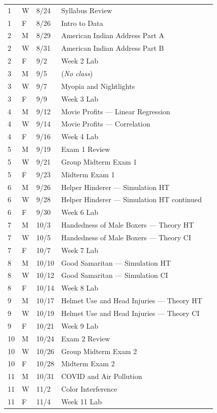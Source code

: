 \documentclass[
]{report}
\begin{document}
\begin{longtable}{|l|l|l|l|p{}|}
1& W& 8/24& Syllabus Review \\*
1& F& 8/26& Intro to Data \\ \hline
2& M& 8/29& American Indian Address Part A \\*
2& W& 8/31& American Indian Address Part B \\* 
2& F& 9/2& Week 2 Lab \\ \hline
3& M& 9/5& (\textit{No class}) \\*
3& W& 9/7& Myopia and Nightlights \\*
3& F& 9/9& Week 3 Lab \\ \hline
4& M& 9/12& Movie Profits --- Linear Regression \\*
4& W& 9/14& Movie Profits --- Correlation \\*
4& F& 9/16& Week 4 Lab \\ \hline
5& M& 9/19& Exam 1 Review \\*
5& W& 9/21& Group Midterm Exam 1 \\*    
5& F& 9/23& Midterm Exam 1 \\ \hline
6& M& 9/26& Helper Hinderer --- Simulation HT \\*
6& W& 9/28& Helper Hinderer --- Simulation HT continued \\* 
6& F& 9/30& Week 6 Lab \\ \hline
7& M& 10/3& Handedness of Male Boxers --- Theory HT \\*
7& W& 10/5&  Handedness of Male Boxers --- Theory CI\\*
7& F& 10/7& Week 7 Lab \\ \hline
8& M& 10/10& Good Samaritan --- Simulation HT \\*
8& W& 10/12& Good Samaritan --- Simulation CI \\*   
8& F& 10/14& Week 8 Lab \\ \hline
9& M& 10/17& Helmet Use and Head Injuries --- Theory HT \\*
9& W& 10/19& Helmet Use and Head Injuries --- Theory CI \\* 
9& F& 10/21& Week 9 Lab \\ \hline
10& M& 10/24& Exam 2 Review \\*
10& W& 10/26& Group Midterm Exam 2 \\*
10& F& 10/28& Midterm Exam 2\\ \hline
11& M& 10/31& COVID and Air Pollution \\*
11& W& 11/2& Color Interference \\* 
11& F& 11/4& Week 11 Lab \\ \hline

\end{longtable}
\end{document}
